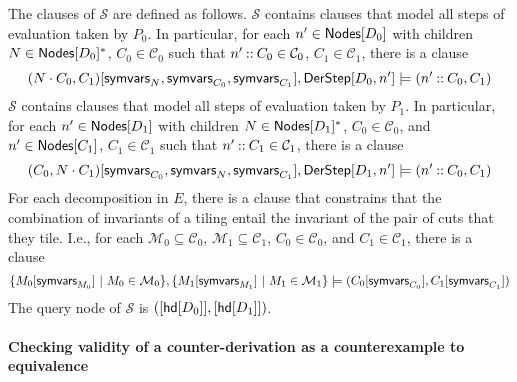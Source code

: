 The clauses of $\mathcal{S}$ are defined as follows.
%
$\mathcal{S}$ contains clauses that model all steps of evaluation
taken by $P_0$.
%
In particular, for each $n' \in \mathsf{Nodes}[ D_0 ]$ with children $N \in
\mathsf{Nodes}[ D_0 ]^{*}$, %
$C_0 \in \mathcal{C}_0$ such that $n' \mathbin{::} C_0 \in \mathcal{C}_0$,
$C_1 \in \mathcal{C}_1$, there is a clause %
\[ (N \concat C_0, C_1)[ \symvars{N}, \symvars{C_0}, \symvars{C_1} ], %
\derstep{D_0}{ n' } \entails %
(n' \cons C_0, C_1) \]
%
%
$\mathcal{S}$ contains clauses that model all steps of evaluation
taken by $P_1$.
%
In particular, for each $n' \in \mathsf{Nodes}[ D_1 ]$ with children $N \in
\mathsf{Nodes}[ D_1 ]^{*}$, %
$C_0 \in \mathcal{C}_0$, and %
$n' \in \mathsf{Nodes}[ C_1 ]$, %
$C_1 \in \mathcal{C}_1$ such that $n' \mathbin{::} C_1 \in \mathcal{C}_1$, %
there is a clause %
\[ (C_0, N \concat C_1)[ \symvars{C_0}, \symvars{N}, \symvars{C_1} ], %
\derstep{D_1}{ n' } \entails %
(n' \cons C_0, C_1) \]
%
For each decomposition in $E$, there is a clause that constrains that
the combination of invariants of a tiling entail the invariant of the
pair of cuts that they tile.
%
I.e., for each $\mathcal{M}_0 \subseteq \mathcal{C}_0$, %
$\mathcal{M}_1 \subseteq \mathcal{C}_1$, %
$C_0 \in \mathcal{C}_0$, and %
$C_1 \in \mathcal{C}_1$, there is a clause
%
\[ \setformer{ M_0[ \symvars{ M_0 } ]}{ M_0 \in \mathcal{M}_0 }, %
\setformer{ M_1[ \symvars{ M_1 } ] }{ M_1 \in \mathcal{M}_1 } \entails %
(C_0[ \symvars{C_0} ], C_1[ \symvars{C_1} ])
\]
%
The query node of $\mathcal{S}$ is $( [ \mathsf{hd}[ D_0 ] ], [ \mathsf{hd}[ D_1 ]
])$.

\paragraph{Checking validity of a counter-derivation as a
  counterexample to equivalence}


